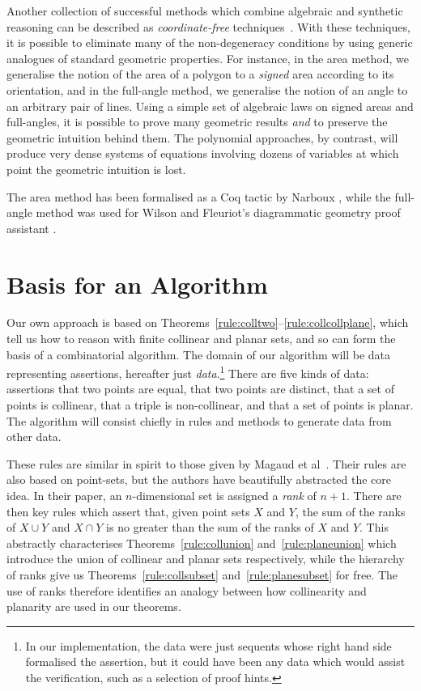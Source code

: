 Another collection of successful methods which combine algebraic and synthetic reasoning can be described as \emph{coordinate-free} techniques~\cite{MachineProofsInGeometry}. With these techniques, it is possible to eliminate many of the non-degeneracy conditions by using generic analogues of standard geometric properties. For instance, in the area method, we generalise the notion of the area of a polygon to a \emph{signed} area according to its orientation, and in the full-angle method, we generalise the notion of an angle to an arbitrary pair of lines. Using a simple set of algebraic laws on signed areas and full-angles, it is possible to prove many geometric results \emph{and} to preserve the geometric intuition behind them. The polynomial approaches, by contrast, will produce very dense systems of equations involving dozens of variables at which point the geometric intuition is lost. 

The area method has been formalised as a Coq tactic by Narboux \cite{NarbouxAreaMethod}, while the full-angle method was used for Wilson and Fleuriot's diagrammatic geometry proof assistant \cite{GeometryExplorer}.

\section{Basis for an Algorithm}
Our own approach is based on Theorems~\ref{rule:colltwo}--\ref{rule:collcollplane}, which tell us how to reason with finite collinear and planar sets, and so can form the basis of a combinatorial algorithm. The domain of our algorithm will be data representing assertions, hereafter just \emph{data}.\footnote{In our implementation, the data were just sequents whose right hand side formalised the assertion, but it could have been any data which would assist the verification, such as a selection of proof hints.} There are five kinds of data: assertions that two points are equal, that two points are distinct, that a set of points is collinear, that a triple is non-collinear, and that a set of points is planar. The algorithm will consist chiefly in rules and methods to generate data from other data.

These rules are similar in spirit to those given by Magaud et al~\cite{RankDesargues}. Their rules are also based on point-sets, but the authors have beautifully abstracted the core idea. In their paper, an $n$-dimensional set is assigned a \emph{rank} of $n+1$. There are then key rules which assert that, given point sets $X$ and $Y$, the sum of the ranks of $X \cup Y$ and $X \cap Y$ is no greater than the sum of the ranks of $X$ and $Y$. This abstractly characterises Theorems~\ref{rule:collunion} and~\ref{rule:planeunion} which introduce the union of collinear and planar sets respectively, while the hierarchy of ranks give us Theorems~\ref{rule:collsubset} and~\ref{rule:planesubset} for free. The use of ranks therefore identifies an analogy between how collinearity and planarity are used in our theorems.

